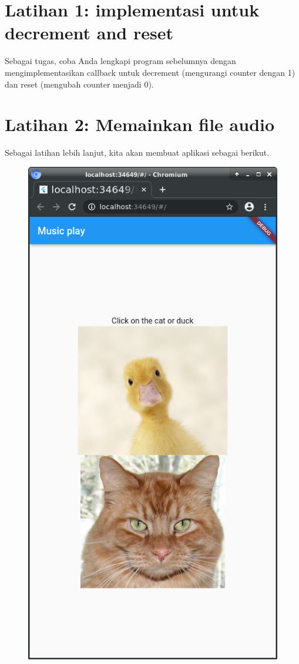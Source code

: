 \documentclass[a4paper,11pt]{article} %
\begin{document}
\section{Latihan 1: implementasi untuk decrement and reset}

Sebagai tugas, coba Anda lengkapi program sebelumnya dengan mengimplementasikan
callback untuk decrement (mengurangi counter dengan 1) dan reset (mengubah counter
menjadi 0).


\section{Latihan 2: Memainkan file audio}

Sebagai latihan lebih lanjut, kita akan membuat aplikasi sebagai berikut.
\begin{figure}[h]
{\centering
\includegraphics[scale=0.4]{images/DuckCat.png}
\par}
\end{figure}
\end{document}
